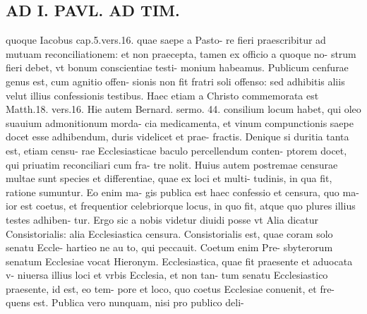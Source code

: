 \documentclass{article}
\begin{document}
\begin{pages}
\section*{AD I. PAVL. AD TIM. }
\marginpar{[ p.320 ]}\pstart quoque Iacobus cap.5.vers.16. quae saepe a Pasto- re fieri praescribitur ad mutuam reconciliationem: et non praecepta, tamen ex officio a quoque no- strum fieri debet, vt bonum conscientiae testi- monium habeamus. Publicum cenfurae genus est, cum agnitio offen- sionis non fit fratri soli offenso: sed adhibitis aliis velut illius confessionis testibus. Haec etiam a Christo commemorata est Matth.18. vers.16. Hie autem Bernard. sermo. 44. consilium locum habet, qui oleo suauium admonitionum morda- cia medicamenta, et vinum compunctionis saepe docet esse adhibendum, duris videlicet et prae- fractis. Denique si duritia tanta est, etiam censu- rae Ecclesiasticae baculo percellendum conten- ptorem docet, qui priuatim reconciliari cum fra- tre nolit. Huius autem postremae censurae multae sunt species et differentiae, quae ex loci et multi- tudinis, in qua fit, ratione sumuntur. Eo enim ma- gis publica est haec confessio et censura, quo ma- ior est coetus, et frequentior celebriorque locus, in quo fit, atque quo plures illius testes adhiben- tur. Ergo sic a nobis videtur diuidi posse vt Alia dicatur Consistorialis: alia Ecclesiastica censura. Consistorialis est, quae coram solo senatu Eccle- hartieo ne au to, qui peccauit. Coetum enim Pre- sbyterorum senatum Ecclesiae vocat Hieronym. Ecclesiastica, quae fit praesente et aduocata v- niuersa illius loci et vrbis Ecclesia, et non tan- tum senatu Ecclesiastico praesente, id est, eo tem- pore et loco, quo coetus Ecclesiae conuenit, et fre- quens est. Publica vero nunquam, nisi pro publico deli-  \pend

\end{pages}
\end{document}
